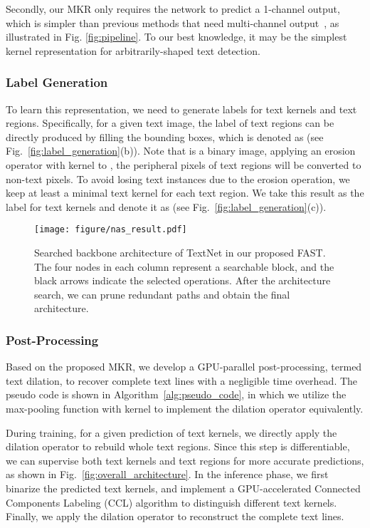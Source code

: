 \documentclass[lettersize,journal]{IEEEtran}
\begin{document}
Secondly, our MKR only requires the network to predict a 1-channel output, which is simpler than previous methods that need multi-channel output~\cite{liao2020real,wang2019shape,wang2019efficient}, as illustrated in Fig. \ref{fig:pipeline}.
To our best knowledge, it may be the simplest kernel representation for arbitrarily-shaped text detection.



\subsubsection{Label Generation}
To learn this representation, we need to generate labels for text kernels and text regions.
Specifically, for a given text image, the label of text regions can be directly produced by filling the bounding boxes, which is denoted as  (see Fig.~\ref{fig:label_generation}(b)). 
Note that  is a binary image, 
applying an erosion operator with  kernel to , the peripheral pixels of text regions will be converted to non-text pixels.
To avoid losing text instances due to the erosion operation, we keep at least a minimal text kernel for each text region.
We take this result as the label for text kernels and denote it as  (see Fig.~\ref{fig:label_generation}(c)). 

\begin{figure*}[t]
    \centering
\texttt{[image: figure/nas\_result.pdf]}
    \caption{
    Searched backbone architecture of TextNet in our proposed FAST.
    The four nodes in each column represent a searchable block, and the black arrows indicate the selected operations.
    After the architecture search, we can prune redundant paths and obtain the final architecture.
    }
\label{fig:nas_result}
\end{figure*}


\subsubsection{Post-Processing}
Based on the proposed MKR, we develop a GPU-parallel post-processing, termed text dilation, to recover complete text lines with a negligible time overhead. The pseudo code is shown in Algorithm~\ref{alg:pseudo_code}, in which we utilize the max-pooling function with  kernel to implement the dilation operator equivalently.

During training, for a given prediction of text kernels, we directly apply the dilation operator to rebuild whole text regions.
Since this step is differentiable, we can supervise both text kernels and text regions for more accurate predictions, as shown in Fig.~\ref{fig:overall_architecture}.
In the inference phase, we first binarize the predicted text kernels, and implement a GPU-accelerated Connected Components Labeling (CCL) algorithm \cite{allegretti2019optimized} to distinguish different text kernels.
Finally, we apply the dilation operator to reconstruct the complete text lines.
\end{document}
